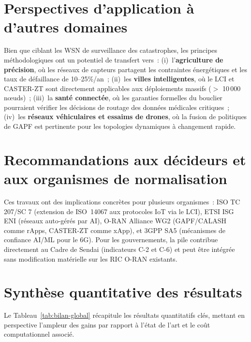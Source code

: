 \section{Perspectives d'application à d'autres domaines}\label{sec:concl-transferabilite}

Bien que ciblant les WSN de surveillance des catastrophes, les principes méthodologiques ont un potentiel de transfert vers~: (i)~l'\textbf{agriculture de précision}, où les réseaux de capteurs partagent les contraintes énergétiques et les taux de défaillance de 10--25\%/an~; (ii)~les \textbf{villes intelligentes}, où le LCI et CASTER-ZT sont directement applicables aux déploiements massifs ($>$ 10\,000 n\oe{}uds)~; (iii)~la \textbf{santé connectée}, où les garanties formelles du bouclier pourraient vérifier les décisions de routage des données médicales critiques~; (iv)~les \textbf{réseaux véhiculaires et essaims de drones}, où la fusion de politiques de GAPF est pertinente pour les topologies dynamiques à changement rapide.


\section{Recommandations aux décideurs et aux organismes de normalisation}\label{sec:concl-institutions}

Ces travaux ont des implications concrètes pour plusieurs organismes~: ISO TC 207/SC 7 (extension de ISO~14067 aux protocoles IoT via le LCI), ETSI ISG ENI (réseaux auto-gérés par AI), O-RAN Alliance WG2 (GAPF/CALASH comme rApps, CASTER-ZT comme xApp), et 3GPP SA5 (mécanismes de confiance AI/ML pour le 6G). Pour les gouvernements, la pile contribue directement au Cadre de Sendai \cite{UNDRR2015Sendai} (indicateurs C-2 et C-6) et peut être intégrée sans modification matérielle sur les RIC O-RAN existants.


\section{Synthèse quantitative des résultats}\label{sec:concl-bilan}

Le Tableau~\ref{tab:bilan-global} récapitule les résultats quantitatifs clés, mettant en perspective l'ampleur des gains par rapport à l'état de l'art et le coût computationnel associé.

